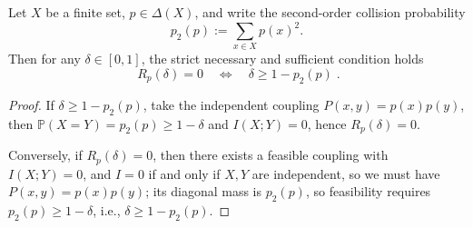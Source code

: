 \begin{proposition}\label{prop:pom-diagonal-rate-zero-threshold-collision}
Let \(X\) be a finite set, \(p\in\Delta(X)\), and write the second-order collision probability
\[
p_2(p):=\sum_{x\in X}p(x)^2.
\]
Then for any \(\delta\in[0,1]\), the strict necessary and sufficient condition holds
\[
\boxed{\;
R_p(\delta)=0\quad\Longleftrightarrow\quad \delta\ge 1-p_2(p)\; } .
\]
\end{proposition}
\begin{proof}
If \(\delta\ge 1-p_2(p)\), take the independent coupling \(P(x,y)=p(x)p(y)\), then \(\mathbb{P}(X=Y)=p_2(p)\ge 1-\delta\) and \(I(X;Y)=0\), hence \(R_p(\delta)=0\).
\par
Conversely, if \(R_p(\delta)=0\), then there exists a feasible coupling with \(I(X;Y)=0\), and \(I=0\) if and only if \(X,Y\) are independent, so we must have \(P(x,y)=p(x)p(y)\);
its diagonal mass is \(p_2(p)\), so feasibility requires \(p_2(p)\ge 1-\delta\), i.e., \(\delta\ge 1-p_2(p)\).
\end{proof}

